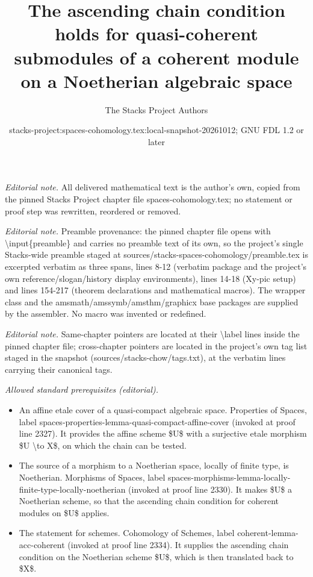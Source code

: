 \documentclass[10pt,a4paper]{amsart}
\title{The ascending chain condition holds for quasi-coherent submodules of a coherent module on a Noetherian algebraic space}
\author{The Stacks Project Authors}
\date{stacks-project:spaces-cohomology.tex:local-snapshot-20261012; GNU FDL 1.2 or later}
\theoremstyle{plain}
\theoremstyle{definition}
\theoremstyle{remark}
\numberwithin{equation}{subsection}
\begin{document}
\maketitle
\noindent\textit{Editorial note.} All delivered mathematical text is the author's own, copied from the pinned Stacks Project chapter file spaces-cohomology.tex; no statement or proof step was rewritten, reordered or removed.\par\medskip
\noindent\textit{Editorial note.} Preamble provenance: the pinned chapter file opens with \textbackslash{}input\{preamble\} and carries no preamble text of its own, so the project's single Stacks-wide preamble staged at sources/stacks-spaces-cohomology/preamble.tex is excerpted verbatim as three spans, lines 8-12 (verbatim package and the project's own reference/slogan/history display environments), lines 14-18 (Xy-pic setup) and lines 154-217 (theorem declarations and mathematical macros). The wrapper class and the amsmath/amssymb/amsthm/graphicx base packages are supplied by the assembler. No macro was invented or redefined.\par\medskip
\noindent\textit{Editorial note.} Same-chapter pointers are located at their \textbackslash{}label lines inside the pinned chapter file; cross-chapter pointers are located in the project's own tag list staged in the snapshot (sources/stacks-chow/tags.txt), at the verbatim lines carrying their canonical tags.\par\medskip
\noindent\textit{Allowed standard prerequisites (editorial).}\begin{itemize}
\item An affine etale cover of a quasi-compact algebraic space. Properties of Spaces, label spaces-properties-lemma-quasi-compact-affine-cover (invoked at proof line 2327). It provides the affine scheme \$U\$ with a surjective etale morphism \$U \textbackslash{}to X\$, on which the chain can be tested.
\item The source of a morphism to a Noetherian space, locally of finite type, is Noetherian. Morphisms of Spaces, label spaces-morphisms-lemma-locally-finite-type-locally-noetherian (invoked at proof line 2330). It makes \$U\$ a Noetherian scheme, so that the ascending chain condition for coherent modules on \$U\$ applies.
\item The statement for schemes. Cohomology of Schemes, label coherent-lemma-acc-coherent (invoked at proof line 2334). It supplies the ascending chain condition on the Noetherian scheme \$U\$, which is then translated back to \$X\$.
\end{itemize}\medskip
\end{document}
